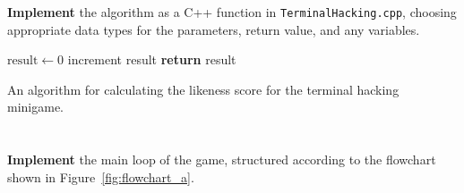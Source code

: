 \textbf{Implement} the algorithm as a C++ function in \texttt{TerminalHacking.cpp}, choosing appropriate data types for the parameters, return value, and any variables.

\begin{algorithm}[t]
\begin{algorithmic}
        \State $\text{result} \gets 0$
                \State increment result
            \EndIf
        \EndFor
        \State \textbf{return} result
    \EndProcedure
\end{algorithmic}
\caption{An algorithm for calculating the likeness score for the terminal hacking minigame.}
\label{alg:a_likeness}
\end{algorithm}

\section{} \label{core-a-last}

\textbf{Implement} the main loop of the game, structured
according to the flowchart shown in Figure~\ref{fig:flowchart_a}.

